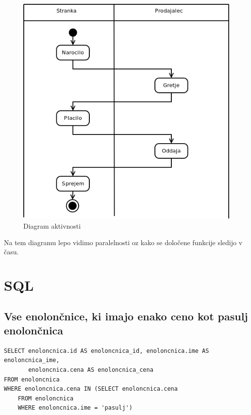 \documentclass[12pt]{article}
\let\stdsection\section
\renewcommand\section{\newpage\stdsection}
\begin{document}
\begin{figure}[htb]
\begin{center}
\includegraphics[scale=0.5]{aktivnosti.png}
\end{center}
\caption{Diagram aktivnosti}
\label{aktivnosti}
\end{figure}

Na tem diagramu lepo vidimo paralelnosti oz kako se določene funkcije sledijo v času.

\newpage

\section{SQL}

\subsection{Vse enolončnice, ki imajo enako ceno kot pasulj enolončnica}

\begin{verbatim}
SELECT enoloncnica.id AS enoloncnica_id, enoloncnica.ime AS enoloncnica_ime,
       enoloncnica.cena AS enoloncnica_cena 
FROM enoloncnica 
WHERE enoloncnica.cena IN (SELECT enoloncnica.cena 
    FROM enoloncnica 
    WHERE enoloncnica.ime = 'pasulj')
\end{verbatim}
\end{document}
